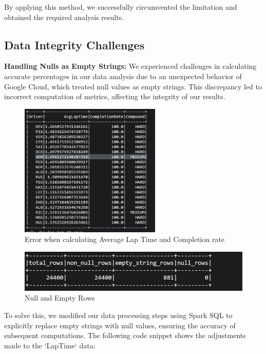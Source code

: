 \documentclass{article}
\begin{document}
By applying this method, we successfully circumvented the limitation and obtained the required analysis results.

\subsection{Data Integrity Challenges}
\textbf{Handling Nulls as Empty Strings:}
We experienced challenges in calculating accurate percentages in our data analysis due to an unexpected behavior of Google Cloud, which treated null values as empty strings. This discrepancy led to incorrect computation of metrics, affecting the integrity of our results.

\begin{figure}[H]
    \centering
    \includegraphics[width=0.6\textwidth]{error-percentages.jpg}
    \caption{Error when calculating Average Lap Time and Completion rate}
\end{figure}


\begin{figure}[H]
    \centering
    \includegraphics[width=\textwidth]{error-integrity-nulls-empty.jpg}
    \caption{Null and Empty Rows}
\end{figure}

To solve this, we modified our data processing steps using Spark SQL to explicitly replace empty strings with null values, ensuring the accuracy of subsequent computations. The following code snippet shows the adjustments made to the `LapTime` data:
\end{document}
